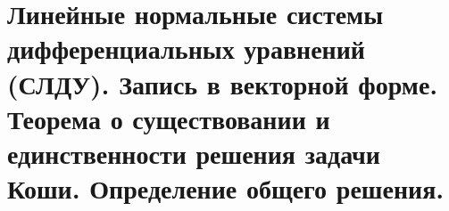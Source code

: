 {
	\section{Линейные нормальные системы дифференциальных уравнений (СЛДУ). Запись в векторной форме. Теорема о
	существовании и единственности решения задачи Коши. Определение общего решения.}

	\newpage
}